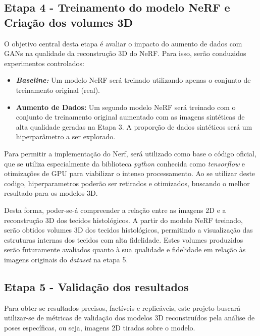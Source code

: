 \subsection{Etapa 4 - Treinamento do modelo NeRF e Criação dos volumes 3D}

O objetivo central desta etapa é avaliar o impacto do aumento de dados com GANs na qualidade da reconstrução 3D do NeRF. Para isso, serão conduzidos experimentos controlados:

\begin{itemize}
  \item \textbf{\textit{Baseline:}} Um modelo NeRF será treinado utilizando apenas o conjunto de treinamento original (real).
\item \textbf{Aumento de Dados:} Um segundo modelo NeRF será treinado com o conjunto de treinamento original aumentado com as imagens sintéticas de alta qualidade geradas na Etapa 3. A proporção de dados sintéticos será um hiperparâmetro a ser explorado.
\end{itemize}

Para permitir a implementação do Nerf, será utilizado como base o código oficial, que se utiliza especialmente da biblioteca \textit{python} conhecida como \textit{tensorflow} e otimizações de GPU para viabilizar o intenso processamento. Ao se utilizar deste codigo, hiperparametros poderão ser retirados e otimizados, buscando o melhor resultado para os modelos 3D.

Desta forma, poder-se-á compreender a relação entre as imagens 2D e a reconstrução 3D dos tecidos histológicos. A partir do modelo NeRF treinado, serão obtidos volumes 3D dos tecidos histológicos, permitindo a visualização das estruturas internas dos tecidos com alta fidelidade. Estes volumes produzidos serão futuramente avaliados quanto à sua qualidade e fidelidade em relação às imagens originais do \textit{dataset} na etapa 5. 

\subsection{Etapa 5 - Validação dos resultados}

Para obter-se resultados precisos, factíveis e replicáveis, este projeto buscará utilizar-se de métricas de validação dos modelos 3D reconstruídos pela análise de poses específicas, ou seja, imagens 2D tiradas sobre o modelo.

